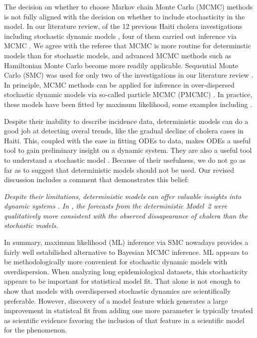 \documentclass[11pt]{article}
\newcommand\article[1]{{\color{blue} \vspace{1mm}\hspace{0.25in}\parbox{6in}{\em #1}}}
\begin{document}
\article{\editDiscussionFour}

The decision on whether to choose Markov chain Monte Carlo (MCMC) methods is not fully aligned with the decision on whether to include stochasticity in the model.
In our literature review, of the 12 previous Haiti cholera investigations including stochastic dynamic models \cite{kirpich17,lee20,pasetto18,mukandavire13,kirpich16,lewnard16,kunkel17,mukandavire15,sallah17,azman12,azman15}, four of them carried out inference via MCMC \cite{pasetto18,lewnard16,sallah17,azman12}.
We agree with the referee that MCMC is more routine for determinstic models than for stochastic models, and advanced MCMC methods such as Hamiltonian Monte Carlo become more readily applicable.
Sequential Monte Carlo (SMC) was used for only two of the investigations in our literature review \cite{lee20,azman15}.
In principle, MCMC methods can be applied for inference in over-dispersed stochastic dynamic models via so-called particle MCMC (PMCMC) \cite{andrieu10}.
In practice, these models have been fitted by maximum likelihood, some examples including \cite{lemaitre19,fox22,molodecky23,pons-salort18,subramanian20,stocks20}.

Despite their inability to describe incidence data, deterministic models can do a good job at detecting overal trends, like the gradual decline of cholera cases in Haiti.
This, coupled with the ease in fitting ODEs to data, makes ODEs a useful tool to gain preliminary insight on a dynamic system.
They are also a useful tool to understand a stochastic model \cite{coulson04}.
Because of their usefulness, we do not go as far as to suggest that deterministic models should not be used. 
Our revised discussion includes a comment that demonstrates this belief:

\article{Despite their limitations, deterministic models can offer valuable insights into dynamic systems \cite{may04}. In \cite{lee20}, the forecasts from the deterministic Model~2 were qualitatively more consistent with the observed dissapearance of cholera than the stochastic models.}

In summary, maximum likelihood (ML) inference via SMC nowadays provides a fairly well estabilished alternative to Bayesian MCMC inference. ML appears to be methodologically more convenient for stochastic dynamic models with overdispersion. When analyzing long epidemiological datasets, this stochasticity appears to be important for statistical model fit. That alone is not enough to show that models with overdispersed stochastic dynamics are scientifically preferable. However, discovery of a  model feature which generates a large improvement in statistcal fit from adding one more parameter is typically treated as scientific evidence favoring the inclusion of that feature in a scientific model for the phenomenon.
\end{document}
